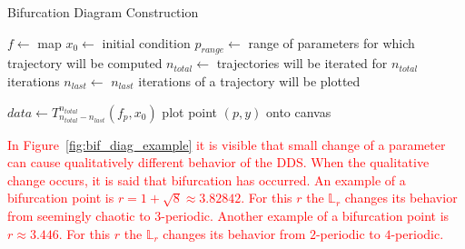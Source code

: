 \begin{algorithm}
\caption{Bifurcation Diagram Construction}\label{bif_diag_alg}
\begin{algorithmic}[1]
\Statex $f \gets$ map
\Statex $x_0 \gets$ initial condition
\Statex $p_{range} \gets$ range of parameters for which trajectory will be computed
\Statex $n_{total} \gets$ trajectories will be iterated for $n_{total}$ iterations
\Statex $n_{last} \gets$ $n_{last}$ iterations of a trajectory will be plotted

    \State $data \leftarrow T_{n_{total}-n_{last}}^{n_{total}}(f_p, x_0)$
        \State plot point $(p, y)$ onto canvas
    \EndFor
\EndFor

\end{algorithmic}
\end{algorithm}

\begin{remark}
    \textcolor{red}{
    In Figure~\ref{fig:bif_diag_example} it is visible that small change of a parameter can cause qualitatively different behavior of the DDS.
    When the qualitative change occurs, it is said that bifurcation has occurred.
    An example of a bifurcation point is $r = 1+\sqrt{8} \approx 3.82842$. For this $r$ the $\mathbb{L}_{r}$ changes its behavior from seemingly chaotic to $3$-periodic. 
    Another example of a bifurcation point is $r \approx 3.446$. For this $r$ the $\mathbb{L}_{r}$ changes its behavior from $2$-periodic to $4$-periodic.
    }
\end{remark}